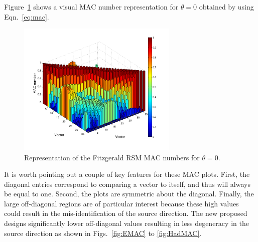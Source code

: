 \documentclass[3p,times]{elsarticle}
\begin{document}
Figure~\ref{fig:RSMMAC} shows a visual MAC number representation for $\theta=0$ obtained by using Eqn.~\ref{eq:mac}. 
 
\begin{figure}[ht!]
\includegraphics[width={3.0in}]{../figs/RSMMAC.pdf}
\centering
\caption{Representation of the Fitzgerald RSM MAC numbers for $\theta=0$.}
\label{fig:RSMMAC}
\end{figure}

It is worth pointing out a couple of key features for these MAC plots. 
First, the diagonal entries correspond to comparing a vector to itself, and thus will always be equal to one.
Second, the plots are symmetric about the diagonal.  
Finally, the large off-diagonal regions are of particular interest because these high values could result in the mis-identification of the source direction. 
The new proposed designs significantly lower off-diagonal values resulting in less degeneracy in the source direction as shown in Figs.~\ref{fig:EMAC} to \ref{fig:HadMAC}.
\end{document}
